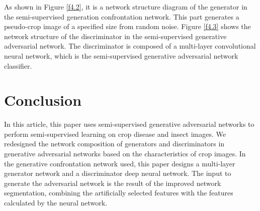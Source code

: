\documentclass[11pt,en]{elegantpaper}
\begin{document}
As shown in Figure \ref{f4.2}, it is a network structure diagram of the generator in the semi-supervised generation confrontation network. This part generates a pseudo-crop image of a specified size from random noise. Figure \ref{f4.3} shows the network structure of the discriminator in the semi-supervised generative adversarial network. The discriminator is composed of a multi-layer convolutional neural network, which is the semi-supervised generative adversarial network classifier.

\section{Conclusion}
In this article, this paper uses semi-supervised generative adversarial networks to perform semi-supervised learning on crop disease and insect images. We redesigned the network composition of generators and discriminators in generative adversarial networks based on the characteristics of crop images. In the generative confrontation network used, this paper designs a multi-layer generator network and a discriminator deep neural network. The input to generate the adversarial network is the result of the improved network segmentation, combining the artificially selected features with the features calculated by the neural network.


\end{document}
